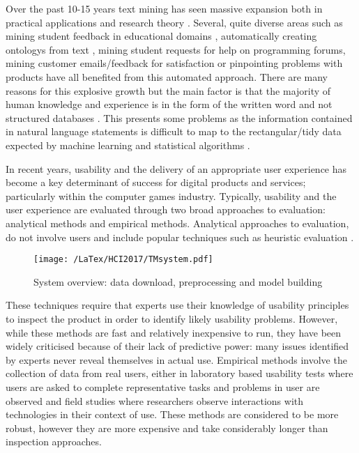 \documentclass{ewic}
\begin{document}
Over the past 10-15 years text mining has seen massive expansion both in practical applications and research theory \cite{Hearst99}. Several, quite diverse areas such as mining student feedback in educational domains \cite{Romero2010,Kumar2015}, automatically creating ontologys from text \cite{Missikoff03}, mining student requests for help on programming forums, mining customer emails/feedback for satisfaction or pinpointing problems with products have all benefited from this automated approach.  There are many reasons for this explosive growth but the main factor is that the majority of human knowledge and experience is in the form of the written word and not structured databases  \cite{Bose2017}. This presents some problems as the information contained in natural language statements is difficult to map to the rectangular/tidy data expected by machine learning and statistical algorithms \cite{Whickham2011}. 


In recent years, usability and the delivery of an appropriate user experience has become a key determinant of success for digital products and services; particularly within the computer games industry.  Typically, usability and the user experience are evaluated through two broad approaches to evaluation: analytical methods and empirical methods.   Analytical approaches to evaluation, do not involve users and include popular techniques such as heuristic evaluation \cite{Nielsen1993}.  

\begin{figure*}[ht]
  \begin{center}
 \texttt{[image: /LaTex/HCI2017/TMsystem.pdf]} %
  \end{center}
 \caption{System overview: data download, preprocessing and model building}
\label{system}
\end{figure*}

These techniques require that experts use their knowledge of usability principles to inspect the product in order to identify likely usability problems.  However, while these methods are fast and relatively inexpensive to run, they have been widely criticised because of their lack of predictive power: many issues identified by experts never reveal themselves in actual use.  Empirical methods involve the collection of data from real users, either in laboratory based usability tests where users are asked to complete representative tasks and problems in user are observed and field studies where researchers observe interactions with technologies in their context of use.  These methods are considered to be more robust, however they are more expensive and take considerably longer than inspection approaches.
\end{document}
